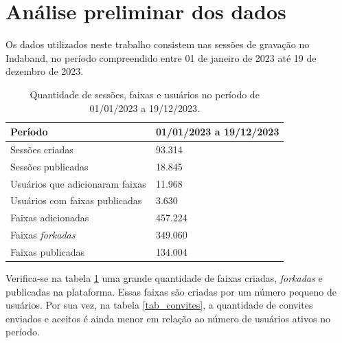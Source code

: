 \section{Análise preliminar dos dados}

Os dados utilizados neste trabalho consistem nas sessões de gravação no
Indaband, no período compreendido entre 01 de janeiro de 2023 até 19 de dezembro
de 2023.


\begin{table}[H]
  \centering
  \begin{tabular}{|l|l|}
    \hline
    \textbf{Período} & 01/01/2023 a 19/12/2023 \\ \hline
    Sessões criadas & 93.314 \\ \hline
    Sessões publicadas & 18.845 \\ \hline
    Usuários que adicionaram faixas & 11.968 \\ \hline
    Usuários com faixas publicadas & 3.630 \\ \hline
    Faixas adicionadas & 457.224 \\ \hline
    Faixas \textit{forkadas} & 349.060 \\ \hline
    Faixas publicadas & 134.004 \\ \hline
  \end{tabular}
  \caption{Quantidade de sessões, faixas e usuários no período de 01/01/2023 a 19/12/2023.}
  \label{tab_sessoes}
\end{table}

Verifica-se na tabela \ref{tab_sessoes} uma grande quantidade de faixas criadas,
\textit{forkadas} e publicadas na plataforma. Essas faixas são criadas por um
número pequeno de usuários. Por sua vez, na tabela \ref{tab_convites}, a
quantidade de convites enviados e aceitos é ainda menor em relação ao número de
usuários ativos no período.

